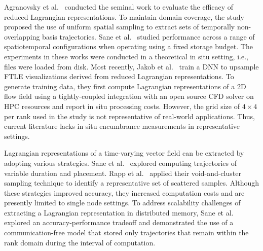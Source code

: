 Agranovsky et al.~\cite{agranovsky2014improved} conducted the seminal work to evaluate the efficacy of reduced Lagrangian representations.
%
To maintain domain coverage, the study proposed the use of uniform spatial sampling to extract sets of temporally non-overlapping basis trajectories.
%
Sane et al.~\cite{sane2018revisiting} studied performance across a range of spatiotemporal configurations when operating using a fixed storage budget.
%
%
The experiments in these works were conducted in a theoretical in situ setting, i.e., files were loaded from disk. %
%
%
%
Most recently, Jakob et al.~\cite{Jakob20} train a DNN to upsample FTLE visualizations derived from reduced Lagrangian representations. 
%
To generate training data, they first compute Lagrangian representations of a 2D flow field using a tightly-coupled integration with an open source CFD solver on HPC resources and report in situ processing costs.
%
However, the grid size of $4\times4$ per rank used in the study is not representative of real-world applications.
%
Thus, current literature lacks in situ encumbrance measurements in representative settings.
%

%
%

Lagrangian representations of a time-varying vector field can be extracted by adopting various strategies.
%
Sane et al.~\cite{sane2019interpolation} explored computing trajectories of variable duration and placement. 
%
Rapp et al.~\cite{rapp2019void} applied their void-and-cluster sampling technique to identify a representative set of scattered samples.
%
Although these strategies improved accuracy, they increased computation costs and are presently limited to single node settings.
%
To address scalability challenges of extracting a Lagrangian representation in distributed memory, Sane et al.~\cite{sane2020scalable} explored an accuracy-performance tradeoff and demonstrated the use of a communication-free model that stored only trajectories that remain within the rank domain during the interval of computation.
%

